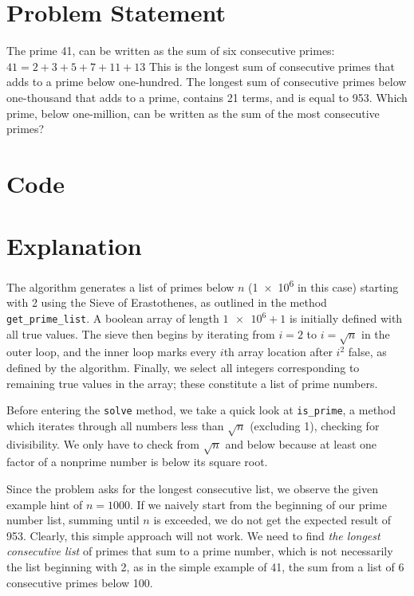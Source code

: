 \documentclass{article}
\begin{document}
    
\section{Problem Statement}

The prime 41, can be written as the sum of six consecutive primes: $41 = 2 + 3 + 5 + 7 + 11 + 13$
This is the longest sum of consecutive primes that adds to a prime below one-hundred. The longest sum of consecutive primes below one-thousand that adds to a prime, contains 21 terms, and is equal to 953. Which prime, below one-million, can be written as the sum of the most consecutive primes?

\section{Code}



\section{Explanation}

The algorithm generates a list of primes below $n$ (\num{1e6} in this case) starting with 2 using the Sieve of Erastothenes, as outlined in the method \verb|get_prime_list|.
A boolean array of length $\num{1e6}+1$ is initially defined with all true values. The sieve then begins by iterating from $i=2$ to $i=\sqrt{n}$ in the outer loop, and the inner loop marks every $i$th array location after $i^2$ false, as defined by the algorithm.
Finally, we select all integers corresponding to remaining true values in the array; these constitute a list of prime numbers.

Before entering the \verb|solve| method, we take a quick look at \verb|is_prime|, a method which
iterates through all numbers less than $\sqrt{n}$ (excluding 1), checking for divisibility. We only have to check from $\sqrt{n}$ and below because at least one factor of a nonprime number is below its square root.

Since the problem asks for the longest consecutive list, we observe the given example hint of $n=1000$.
If we naively start from the beginning of our prime number list, summing until $n$ is exceeded, we do not get the expected result of 953.
Clearly, this simple approach will not work. We need to find \textit{the longest consecutive list} of primes that sum to a prime number, which is not necessarily
the list beginning with 2, as in the simple example of 41, the sum from a list of 6 consecutive primes below 100.
\end{document}
